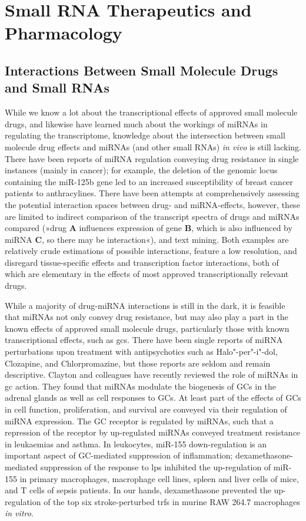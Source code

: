\section{Small RNA Therapeutics and Pharmacology} \label{sec:discussion:therapy}
\subsection{Interactions Between Small Molecule Drugs and Small RNAs}
While we know a lot about the transcriptional effects of approved small molecule drugs, and likewise have learned much about the workings of miRNAs in regulating the transcriptome, knowledge about the intersection between small molecule drug effects and miRNAs (and other small RNAs) \emph{in vivo} is still lacking. There have been reports of miRNA regulation conveying drug resistance in single instances (mainly in cancer);\cite{Ma2010} for example, the deletion of the genomic locus containing the miR-125b gene led to an increased susceptibility of breast cancer patients to anthracylines.\cite{Climent2007} There have been attempts at comprehensively assessing the potential interaction spaces between drug- and miRNA-effects,\cite{Meng2016, Xie2019} however, these are limited to indirect comparison of the transcript spectra of drugs and miRNAs compared (»drug \textbf{A} influences expression of gene \textbf{B}, which is also influenced by miRNA \textbf{C}, so there may be interaction«), and text mining. Both examples are relatively crude estimations of possible interactions, feature a low resolution, and disregard tissue-specific effects and transcription factor interactions, both of which are elementary in the effects of most approved transcriptionally relevant drugs.\cite{Clayton2018}

While a majority of drug-miRNA interactions is still in the dark, it is feasible that miRNAs not only convey drug resistance, but may also play a part in the known effects of approved small molecule drugs, particularly those with known transcriptional effects, such as \acfp{gc}. There have been single reports of miRNA perturbations upon treatment with antipsychotics such as Halo"-per"-i"-dol, Clozapine, and Chlorpromazine, but those reports are seldom and remain descriptive.\cite{Gardiner2014} Clayton and colleagues have recently reviewed the role of miRNAs in \ac{gc} action.\cite{Clayton2018} They found that miRNAs modulate the biogenesis of GCs in the adrenal glands as well as cell responses to GCs. At least part of the effects of GCs in cell function, proliferation, and survival are conveyed via their regulation of miRNA expression. The GC receptor is regulated by miRNAs, such that a repression of the receptor by up-regulated miRNAs conveyed treatment resistance in leukaemias and asthma. In leukocytes, miR-155 down-regulation is an important aspect of GC-mediated suppression of inflammation; dexamethasone-mediated suppression of the response to \acf{lps} inhibited the up-regulation of miR-155 in primary macrophages, macrophage cell lines, spleen and liver cells of mice, and T cells of sepsis patients.\cite{Clayton2018} In our hands, dexamethasone prevented the up-regulation of the top six stroke-perturbed \acfp{trf} in murine RAW 264.7 macrophages \emph{in vitro}.\cite{Winek2020}


